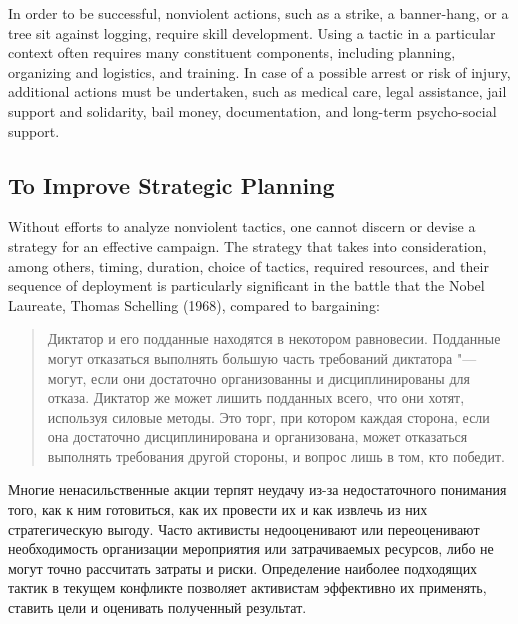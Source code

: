 \documentclass[twoside,a4paper,12pt,fleqn,openany]{extbook}
\newcommand{\ml}[2]{#2}
\begin{document}
In order to be successful, nonviolent actions, such as a strike, a banner-hang, or a tree
sit against logging, require skill development. Using a tactic in a particular context often
requires many constituent components, including planning, organizing and logistics, and
training. In case of a possible arrest or risk of injury, additional actions must be undertaken, such as medical care, legal assistance, jail support and solidarity, bail money, documentation, and long-term psycho-social support.

\subsection*{To Improve Strategic Planning}

Without efforts to analyze nonviolent tactics, one cannot discern or devise a strategy for an effective campaign. The strategy that takes into consideration, among others, timing, duration, choice of tactics, required resources, and their sequence of deployment is particularly significant in the battle that the Nobel Laureate, Thomas Schelling (1968), compared to bargaining:

\begin{quote}
\ml
{The tyrant and his subjects are in somewhat symmetrical positions.}
{Диктатор и его подданные находятся в некотором равновесии.}
\ml
{They can deny him most of what he wants—they can, that is, if they have the disciplined organization to refuse collaboration.}
{Подданные могут отказаться выполнять большую часть требований диктатора "--- могут, если они достаточно организованны и дисциплинированы для отказа.}
\ml
{And he can deny them just about everything they want—he can deny it by using the force at his command...}
{Диктатор же может лишить подданных всего, что они хотят, используя силовые методы.}
\ml
{It is a bargaining situation in which either side, if adequately disciplined and organized, can deny most of what the other wants; and it remains to see who wins.}
{Это торг, при котором каждая сторона, если она достаточно дисциплинирована и организована, может отказаться выполнять требования другой стороны, и вопрос лишь в том, кто победит.}
\end{quote}

\ml
{Many nonviolent actions can fail because there is little tactical understanding of how to prepare for, perform, and reap strategic benefits from them.}
{Многие ненасильственные акции терпят неудачу из-за недостаточного понимания того, как к ним готовиться, как их провести их и как извлечь из них стратегическую выгоду.}
\ml
{In some cases, activists under- or over-estimate the resources and organizing required, or fail to accurately calculate the costs and risks associated with an action.}
{Часто активисты недооценивают или переоценивают необходимость организации мероприятия или затрачиваемых ресурсов, либо не могут точно рассчитать затраты и риски.}
\ml
{Identifying which tactics will be most successful in a conflict provides campaigners with opportunities to effectively deploy them as well as identify and assess their desired outcomes.}
{Определение наиболее подходящих тактик в текущем конфликте позволяет активистам эффективно их применять, ставить цели и оценивать полученный результат.}
\end{document}
